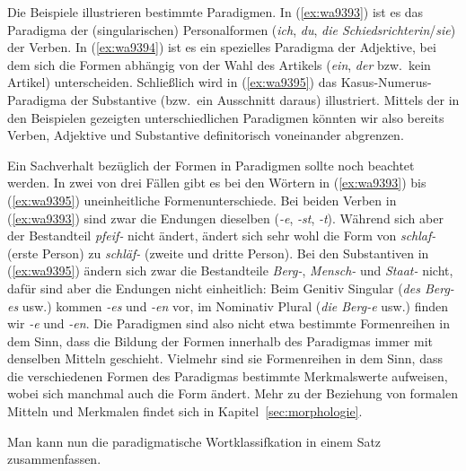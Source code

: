 Die Beispiele illustrieren bestimmte Paradigmen.
In (\ref{ex:wa9393}) ist es das Paradigma der (singularischen) Personalformen (\textit{ich}, \textit{du}, \textit{die Schiedsrichterin}/\textit{sie}) der Verben.
In (\ref{ex:wa9394}) ist es ein spezielles Paradigma der Adjektive, bei dem sich die Formen abhängig von der Wahl des Artikels (\textit{ein}, \textit{der} bzw.\ kein Artikel) unterscheiden.
Schließlich wird in (\ref{ex:wa9395}) das Kasus-Numerus-Paradigma der Substantive (bzw.\ ein Ausschnitt daraus) illustriert.
Mittels der in den Beispielen gezeigten unterschiedlichen Paradigmen könnten wir also bereits Verben, Adjektive und Substantive definitorisch voneinander abgrenzen.

Ein Sachverhalt bezüglich der Formen in Paradigmen sollte noch beachtet werden.
In zwei von drei Fällen gibt es bei den Wörtern in (\ref{ex:wa9393}) bis (\ref{ex:wa9395}) uneinheitliche Formenunterschiede.
Bei beiden Verben in (\ref{ex:wa9393}) sind zwar die Endungen dieselben (\textit{-e}, \textit{-st}, \textit{-t}).
Während sich aber der Bestandteil \textit{pfeif-} nicht ändert, ändert sich sehr wohl die Form von \textit{schlaf-} (erste Person) zu \textit{schläf-} (zweite und dritte Person).
Bei den Substantiven in (\ref{ex:wa9395}) ändern sich zwar die Bestandteile \textit{Berg-}, \textit{Mensch-} und \textit{Staat-} nicht, dafür sind aber die Endungen nicht einheitlich:
Beim Genitiv Singular (\textit{des Berg-es} usw.) kommen \textit{-es} und \textit{-en} vor, im Nominativ Plural (\textit{die Berg-e} usw.) finden wir \textit{-e} und \textit{-en}.
Die Paradigmen sind also nicht etwa bestimmte Formenreihen in dem Sinn, dass die Bildung der Formen innerhalb des Paradigmas immer mit denselben Mitteln geschieht.
Vielmehr sind sie Formenreihen in dem Sinn, dass die verschiedenen Formen des Paradigmas bestimmte Merkmalswerte aufweisen, wobei sich manchmal auch die Form ändert.
Mehr zu der Beziehung von formalen Mitteln und Merkmalen findet sich in Kapitel~\ref{sec:morphologie}.


Man kann nun die paradigmatische Wortklassifkation in einem Satz zusammenfassen.


